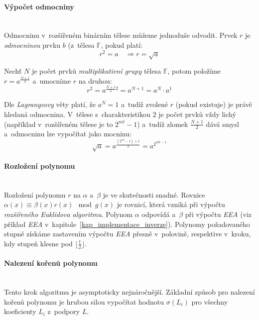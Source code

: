 \documentclass[thesis=M,czech,hidelinks]{FITthesis}[2012/06/26]
\newcommand{\0}{{\textcolor[gray]{0.75}{0}}}
\begin{document}
\paragraph{Výpočet odmocniny} \hfil \\
Odmocninu v~rozšířeném binárním tělese můžeme jednoduše odvodit. Prvek $r$ je
\emph{odmocninou} prvku $b$ (z~tělesa $\mathbb{F}$, pokud platí:
$$ r^2 = a \quad \Rightarrow r = \sqrt{a} $$

Nechť $N$ je počet prvků \emph{multiplikativní grupy} tělesa $\mathbb{F}$, potom
položíme \\
$r = a^{\frac{N+1}{2}} $ a~umocníme $r$ na druhou:
$$ r^2 = a^{\frac{N+1}{2} 2} = a^{N+1} = a^N \cdot a^1 $$

Dle \emph{Lagrangeovy} věty platí, že $a^N = 1 $ a~tudíž zvolené $r$ (pokud
existuje) je právě hledaná odmocnina. V~tělese s~charakteristikou $2$ je počet
prvků vždy lichý (například v~rozšířeném tělese je to $2^{mt}-1$) a~tudíž zlomek
$\frac{N+1}{2}$ dává smysl a~odmocninu lze vypočítat jako mocninu:
$$ \sqrt{a} = a^{\frac{(2^{mt}-1) + 1}{2}} = a^{2^{mt - 1}} $$


\paragraph{Rozložení polynomu} \hfil \\
Rozložení polynomu $r$ na $\alpha$ a~$\beta$ je ve skutečnosti snadné. Rovnice
$\alpha(x) \equiv \beta(x) r(x) \mod g(x)$ je rovnicí, která vzniká při výpočtu
\emph{rozšířeného Euklidova algoritmu}. Polynom $\alpha$ odpovídá 
a~$\beta$  při výpočtu \emph{EEA} (viz příklad \emph{EEA}
v~kapitole~\ref{kap_implementace_inverze}). Polynomy požadovaného stupně získáme
zastavením výpočtu \emph{EEA} přesně v~polovině, respektive v~kroku, kdy
stupeň  klesne pod $\lfloor\frac{t}{2}\rfloor$.


\paragraph{Nalezení kořenů polynomu} \hfil \\
Tento krok algoritmu je asymptoticky nejnáročnější. Základní způsob pro nalezení
kořenů polynomu je hrubou silou vypočítat hodnotu $\sigma(L_i)$ pro všechny
koeficienty $L_i$ z~podpory $L$.
\end{document}
